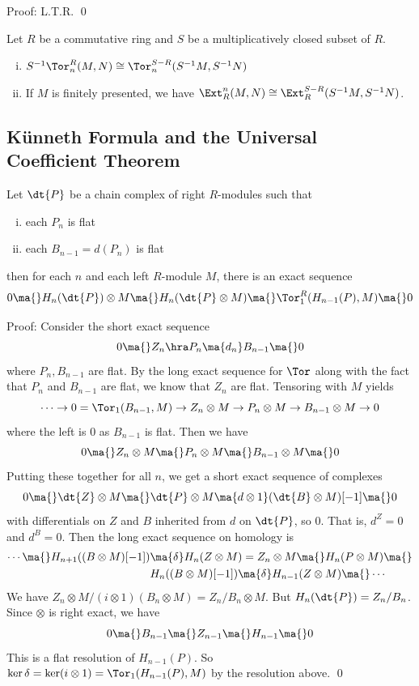 \noindent Proof: L.T.R. \qed \\

\begin{prop}[Localization]
Let $R$ be a commutative ring and $S$ be a multiplicatively closed subset of $R$.
\begin{enumerate}[(i)]
\item $S^{-1}\Tor_n^R(M,N) \cong \Tor_n^{S-R}(S^{-1}M,S^{-1}N)$
\item If $M$ is finitely presented, we have $\Ext_R^n(M,N) \cong \Ext_R^{S-R}(S^{-1}M,S^{-1}N)$.
\end{enumerate}
\end{prop}

\subsection{K\"unneth Formula and the Universal Coefficient Theorem}

\begin{thm}
Let $\dt{P}$ be a chain complex of right $R$-modules such that 
\begin{enumerate}[(i)]
\item each $P_n$ is flat
\item each $B_{n-1}=d(P_n)$ is flat
\end{enumerate}
then for each $n$ and each left $R$-module $M$, there is an exact sequence
\[
0 \ma{} H_n(\dt{P}) \otimes M \ma{} H_n(\dt{P} \otimes M) \ma{} \Tor_1^R(H_{n-1}(P),M) \ma{} 0
\]
\end{thm}

\noindent Proof: Consider the short exact sequence
\[
0 \ma{} Z_n \hra P_n \ma{d_n} B_{n-1} \ma{} 0
\]
where $P_n,B_{n-1}$ are flat. By the long exact sequence for $\Tor$ along with the fact that $P_n$ and $B_{n-1}$ are flat, we know that $Z_n$ are flat. Tensoring with $M$ yields
\[
\cdots \to 0=\Tor_1(B_{n-1},M) \to Z_n \otimes M \to P_n \otimes M \to B_{n-1} \otimes M \to 0
\]
where the left is 0 as $B_{n-1}$ is flat. Then we have
\[
0 \ma{} Z_n \otimes M \ma{} P_n \otimes M \ma{} B_{n-1} \otimes M \ma{} 0
\] 
Putting these together for all $n$, we get a short exact sequence of complexes
\[
0 \ma{} \dt{Z} \otimes M \ma{} \dt{P} \otimes M \ma{d \otimes 1} (\dt{B} \otimes M)[-1] \ma{} 0
\]
with differentials on $Z$ and $B$ inherited from $d$ on $\dt{P}$, so 0. That is, $d^Z=0$ and $d^B=0$. Then the long exact sequence on homology is
\[
\begin{split}
\cdots \ma{} H_{n+1}((B \otimes M)[-1]) &\ma{\delta} H_n(Z \otimes M)=Z_n \otimes M \ma{} H_n(P \otimes M) \ma{} \\
&H_n((B \otimes M)[-1]) \ma{\delta} H_{n-1}(Z \otimes M) \ma{} \cdots
\end{split}
\]
We have $Z_n \otimes M/(i \otimes 1)(B_n \otimes M)= Z_n/B_n \otimes M$. But $H_n(\dt{P})=Z_n/B_n$. Since $\otimes$ is right exact, we have
\[
0 \ma{} B_{n-1} \ma{} Z_{n-1} \ma{} H_{n-1} \ma{} 0
\]
This is a flat resolution of $H_{n-1}(P)$. So $\ker \delta=\ker(i \otimes 1)=\Tor_1(H_{n-1}(P),M)$ by the resolution above. \qed \\

